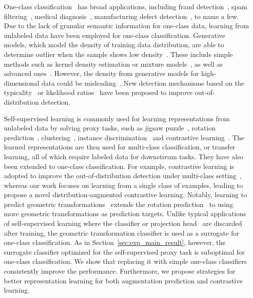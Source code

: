 \documentclass{article} \usepackage{iclr2021_conference,times}
\begin{document}
One-class classification~\citep{moya1993one} has broad applications, including fraud detection~\citep{phua2010comprehensive}, spam filtering~\citep{santos2011spam}, medical diagnosis~\citep{schlegl2017unsupervised}, manufacturing defect detection~\citep{bergmann2019mvtec}, to name a few.
Due to the lack of granular semantic information for one-class data, learning from unlabeled data have been employed for one-class classification.
Generative models, which model the density of training data distribution, are able to determine outlier when the sample shows low density~\citep{schlegl2017unsupervised,zong2018deep,huang2019inverse}. These include simple methods such as kernel density estimation or mixture models~\citep{bishop2006pattern}, as well as advanced ones~\citep{bengio2007greedy,kingma2013auto,goodfellow2014generative,van2016pixel,van2016conditional,dinh2016density,kingma2018glow}. 
However,  the density from generative models for high-dimensional data could be misleading~\citep{nalisnick2018deep,vskvara2018generative,choi2018waic,kirichenko2020normalizing}. New detection mechanisms based on the typicality~\citep{nalisnick2019detecting} or likelihood ratios~\citep{ren2019likelihood} have been proposed to improve out-of-distribution detection. 


Self-supervised learning is commonly used for learning representations from unlabeled data by solving proxy tasks, such as jigsaw puzzle~\citep{noroozi2016unsupervised}, rotation prediction~\citep{gidaris2018unsupervised}, clustering~\citep{caron2018deep}, instance discrimination~\citep{ye2019unsupervised} and contrastive learning~\citep{oord2018representation,chen2020simple,he2020momentum}.
The learned representations are then used for multi-class classification, or transfer learning, all of which require labeled data for downstream tasks.
They have also been extended to one-class classification. For example, contrastive learning is adopted to improve the out-of-distribution detection under multi-class setting~\citep{winkens2020contrastive}, whereas our work focuses on learning from a single class of examples, leading to propose a novel distribution-augmented contrastive learning. Notably, learning to predict geometric transformations~\citep{golan2018deep,hendrycks2019using,bergman2020classification} extends the rotation prediction~\citep{gidaris2018unsupervised} to using more geometric transformations as prediction targets. Unlike typical applications of self-supervised learning where the classifier or projection head~\citep{chen2020simple} are discarded after training, the geometric transformation classifier is used as a surrogate for one-class classification. As in Section~\ref{sec:exp_main_result}, however, the surrogate classifier optimized for the self-supervised proxy task is suboptimal for one-class classification. We show that replacing it with simple one-class classifiers consistently improve the performance. Furthermore, we propose strategies for better representation learning for both augmentation prediction and contrastive learning.
\end{document}
